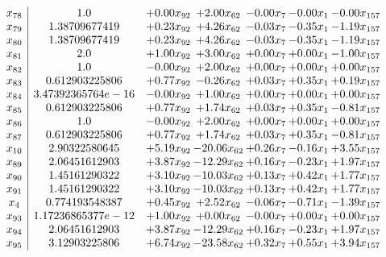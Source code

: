 \documentclass[8pt]{article}
\begin{document}
\[\begin{array}{c| c c@{\hskip 2pt} c@{\hskip 2pt} c@{\hskip 2pt} c@{\hskip 2pt} c@{\hskip 2pt} }
 x_{78}   &  1.0 & +  0.00 x_{92} & +  2.00 x_{62} & -0.00 x_{7} & -0.00 x_{1} & -0.00 x_{157}\\
 x_{79}   &  1.38709677419 & +  0.23 x_{92} & +  4.26 x_{62} & -0.03 x_{7} & -0.35 x_{1} & -1.19 x_{157}\\
 x_{80}   &  1.38709677419 & +  0.23 x_{92} & +  4.26 x_{62} & -0.03 x_{7} & -0.35 x_{1} & -1.19 x_{157}\\
 x_{81}   &  2.0 & +  1.00 x_{92} & +  3.00 x_{62} & +  0.00 x_{7} & +  0.00 x_{1} & -1.00 x_{157}\\
 x_{82}   &  1.0 & -0.00 x_{92} & +  2.00 x_{62} & +  0.00 x_{7} & +  0.00 x_{1} & +  0.00 x_{157}\\
 x_{83}   &  0.612903225806 & +  0.77 x_{92} & -0.26 x_{62} & +  0.03 x_{7} & +  0.35 x_{1} & +  0.19 x_{157}\\
 x_{84}   &  3.47392365764e-16 & -0.00 x_{92} & +  1.00 x_{62} & +  0.00 x_{7} & +  0.00 x_{1} & +  0.00 x_{157}\\
 x_{85}   &  0.612903225806 & +  0.77 x_{92} & +  1.74 x_{62} & +  0.03 x_{7} & +  0.35 x_{1} & -0.81 x_{157}\\
 x_{86}   &  1.0 & -0.00 x_{92} & +  2.00 x_{62} & +  0.00 x_{7} & +  0.00 x_{1} & +  0.00 x_{157}\\
 x_{87}   &  0.612903225806 & +  0.77 x_{92} & +  1.74 x_{62} & +  0.03 x_{7} & +  0.35 x_{1} & -0.81 x_{157}\\
 x_{10}   &  2.90322580645 & +  5.19 x_{92} & -20.06 x_{62} & +  0.26 x_{7} & -0.16 x_{1} & +  3.55 x_{157}\\
 x_{89}   &  2.06451612903 & +  3.87 x_{92} & -12.29 x_{62} & +  0.16 x_{7} & -0.23 x_{1} & +  1.97 x_{157}\\
 x_{90}   &  1.45161290322 & +  3.10 x_{92} & -10.03 x_{62} & +  0.13 x_{7} & +  0.42 x_{1} & +  1.77 x_{157}\\
 x_{91}   &  1.45161290322 & +  3.10 x_{92} & -10.03 x_{62} & +  0.13 x_{7} & +  0.42 x_{1} & +  1.77 x_{157}\\
 x_{4}   &  0.774193548387 & +  0.45 x_{92} & +  2.52 x_{62} & -0.06 x_{7} & -0.71 x_{1} & -1.39 x_{157}\\
 x_{93}   &  1.17236865377e-12 & +  1.00 x_{92} & +  0.00 x_{62} & -0.00 x_{7} & +  0.00 x_{1} & +  0.00 x_{157}\\
 x_{94}   &  2.06451612903 & +  3.87 x_{92} & -12.29 x_{62} & +  0.16 x_{7} & -0.23 x_{1} & +  1.97 x_{157}\\
 x_{95}   &  3.12903225806 & +  6.74 x_{92} & -23.58 x_{62} & +  0.32 x_{7} & +  0.55 x_{1} & +  3.94 x_{157}\\

\end{array}\]
\end{document}
